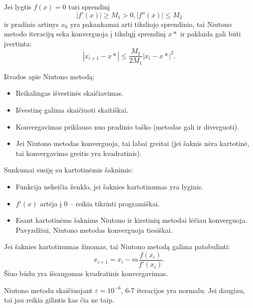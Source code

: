 \begin{prop}
  Jei lygtis $f(x) = 0$ turi sprendinį
  \begin{equation*}
    |f'(x)| \geq M_{1} > 0, |f''(x)| \leq M_{2}
  \end{equation*}
  ir pradinis artinys $x_{0}$ yra pakankamai arti tiksliojo sprendinio, tai
  Niutono metodo iteracijų seka konverguoja į tikslųjį sprendinį $x*$ ir
  paklaida gali būti įvertinta:
  \begin{equation*}
    |x_{i+1} - x*| \leq \frac{M_{2}}{2M_{1}}|x_{i} - x*|^{2}.
  \end{equation*}
\end{prop}


Išvados apie Niutono metodą:
\begin{itemize}
  \item Reikalingas išvestinės skaičiavimas.
  \item Išvestinę galima skaičiuoti skaitiškai.
  \item Konvergavimas priklauso nuo pradinio taško (metodas gali ir
    diverguoti).
  \item Jei Niutono metodas konverguoja, tai labai greitai (jei šaknis nėra
    kartotinė, tai konvergavimo greitis yra kvadratinis).
\end{itemize}



Sunkumai susiję su kartotinėmis šaknimis:
\begin{itemize}
  \item Funkcija nekeičia ženklo, jei šaknies kartotinumas yra lyginis.
  \item $f'(x)$ artėja į 0 – reikia tikrinti programiškai.
  \item Esant kartotinėms šaknims Niutono ir kirstinių metodai lėčiau
    konverguoja. Pavyzdžiui, Niutono metodas konverguoja tiesiškai.
\end{itemize}

Jei šaknies kartotinumas žinomas, tai Niutono metodą galima patobulinti:
\begin{equation*}
  x_{i+1} = x_{i} - m\frac{f(x_{i})}{f'(x_{i})}.
\end{equation*}
Šiuo būdu yra išsaugomas kvadratinis konvergavimas.

Niutono metodu skaičiuojant $\varepsilon = 10^{-6}$,  6-7 iteracijos
yra normalu. Jei daugiau, tai jau reikia gilintis kas čia ne taip.

